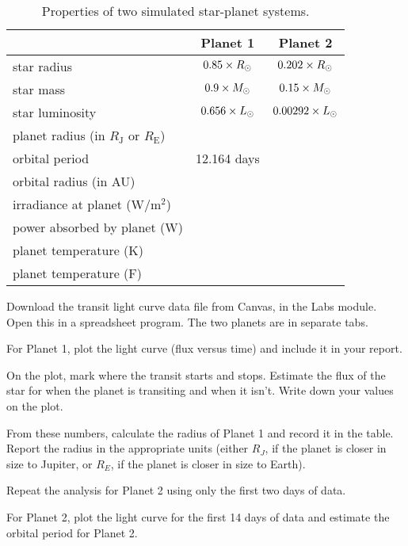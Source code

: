\begin{table}
	\centering
	\begin{tabular}{l|c|c}
		\toprule
		& Planet 1 & Planet 2 \\
		\midrule
		star radius & $0.85 \times R_\textrm{\astrosun}$ & $0.202 \times R_\textrm{\astrosun}$  \\
		\midrule
		star mass & $0.9 \times M_\textrm{\astrosun}$ & $0.15 \times M_\textrm{\astrosun}$ \\
		\midrule
		star luminosity & $0.656 \times L_\textrm{\astrosun}$ & $0.00292 \times L_\textrm{\astrosun}$ \\
		\midrule
		planet radius (in $R_\textrm{J}$ or $R_\textrm{E}$) & & \\
		\midrule
		orbital period & 12.164 days & \\
		\midrule
		orbital radius (in AU) & & \\
		\midrule
		irradiance at planet (W$/$m$^2$) & & \\
		\midrule
		power absorbed by planet (W) & & \\
		\midrule
		planet temperature (K) & & \\
		\midrule
		planet temperature (\textdegree F) & & \\
		\bottomrule
	\end{tabular}
	\caption{Properties of two simulated star-planet systems.}\label{tr:tab:properties}
\end{table}

\begin{steps}	
	
	\item Download the transit light curve data file from Canvas, in the Labs module. Open this in a spreadsheet program. The two planets are in separate tabs.
	
	\item For Planet 1, plot the light curve (flux versus time) and include it in your report.

	\item On the plot, mark where the transit starts
and stops. Estimate the flux of the star for when the planet is transiting
and when it isn’t. Write down your values on the plot.

	\item From these
numbers, calculate the radius of Planet 1 and record it in the table.
Report the radius in the appropriate units (either $R_J$, if the planet is
closer in size to Jupiter, or $R_E$, if the planet is closer in size to Earth).

	\item Repeat the analysis for Planet 2 using only the first two days of data.

	\item For Planet 2, plot the light curve for the first 14 days of data and
estimate the orbital period for Planet 2.
\end{steps}

